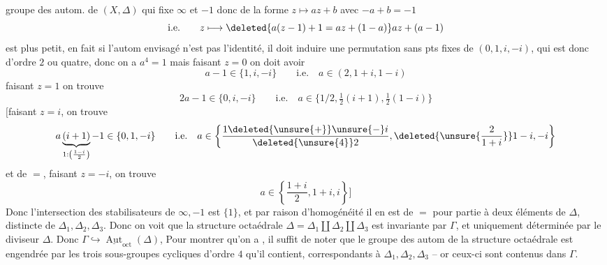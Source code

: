 groupe des autom. de \((X,\Delta)\) qui fixe \(\infty\) et \(-1\) donc  de la forme \(z\mapsto az+b\) avec \(-a+b=-1\)
\[
\text{i.e.}\qquad z\longmapsto\deleted{a(z-1)+1=az+(1-a)}az+(a-1)
\]
est plus petit, en fait si l'autom envisagé n'est pas l'identité, il doit induire une permutation sans pts fixes de \((0,1,i,-i)\), qui est donc d'ordre \(2\) ou quatre, donc on a \(a^4=1\)   mais faisant \(z=0\) on doit avoir
\[
a-1\in\{1,i,-i\}\qquad\text{i.e.}\quad a\in(2,1+i,1-i)
\]
faisant \(z=1\) on trouve
\[
2a-1\in\{0,i,-i\}\qquad\text{i.e.}\quad
a\in\{1/2,\tfrac12(i+1),\tfrac12(1-i)\}
\]
\(\bigl[\)faisant \(z=i\), on trouve
\[
a\underbrace{(i+1)}_{1:\left(\frac{1-i}{2}\right)}-1\in\{0,1,-i\}\qquad\text{i.e.}\quad
a\in\left\{\frac{1\deleted{\unsure{+}}\unsure{-}i}{\deleted{\unsure{4}}2},\deleted{\unsure{\frac{2}{1+i}}}1-i,-i\right\}
\]
et de \(=\), faisant \(z=-i\), on trouve
\[
a\in\left\{\frac{1+i}{2},1+i,i\right\}\biggr]
\]
Donc l'intersection des stabilisateurs de \(\infty,-1\) est \(\{1\}\), et par raison d'homogénéité il en est de \(=\) pour  partie à deux éléments de \(\Delta\), distincte de \(\Delta_1,\Delta_2,\Delta_3\). Donc on voit que la structure octaédrale \(\Delta=\Delta_1\amalg\Delta_2\amalg\Delta_3\) est invariante par \(\Gamma\), et uniquement déterminée par le diviseur \(\Delta\). Donc \(\Gamma\hookrightarrow\underline{\operatorname{Aut}}_{\mathrm{oct}}(\Delta)\),
Pour montrer qu'on a , il suffit de noter que le groupe des autom  de la structure octaédrale est engendrée par les trois sous-groupes cycliques d'ordre \(4\)  qu'il contient, correspondants à \(\Delta_1,\Delta_2,\Delta_3\) -- or ceux-ci sont contenus dans \(\Gamma\).

